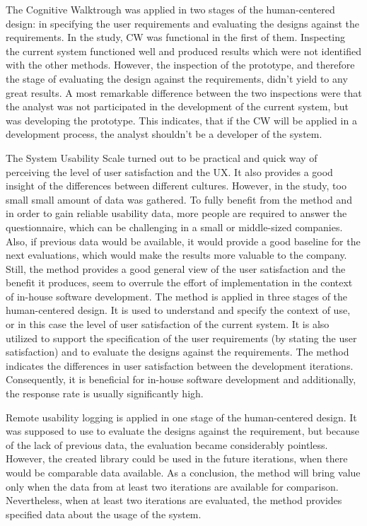 \documentclass[12pt,a4paper,oneside,pdftex]{report}
\begin{document}
The Cognitive Walktrough was applied in two stages of the human-centered design: in specifying the user requirements and evaluating the designs against the requirements. In the study, CW was functional in the first of them. Inspecting the current system functioned well and produced results which were not identified with the other methods. However, the inspection of the prototype, and therefore the stage of evaluating the design against the requirements, didn't yield to any great results. A most remarkable difference between the two inspections were that the analyst was not participated in the development of the current system, but was developing the prototype. This indicates, that if the CW will be applied in a development process, the analyst shouldn't be a developer of the system.  

The System Usability Scale turned out to be practical and quick way of perceiving the level of user satisfaction and the UX. It also provides a good insight of the differences between different cultures. However, in the study, too small small amount of data was gathered. To fully benefit from the method and in order to gain reliable usability data, more people are required to answer the questionnaire, which can be challenging in a small or middle-sized companies. Also, if previous data would be available, it would provide a good baseline for the next evaluations, which would make the results more valuable to the company. Still, the method provides a good general view of the user satisfaction and the benefit it produces, seem to overrule the effort of implementation in the context of in-house software development. The method is applied in three stages of the human-centered design. It is used to understand and specify the context of use, or in this case the level of user satisfaction of the current system. It is also utilized to support the specification of the user requirements (by stating the user satisfaction) and to evaluate the designs against the requirements. The method indicates the differences in user satisfaction between the development iterations. Consequently, it is beneficial for in-house software development and additionally, the response rate is usually significantly high.   

Remote usability logging is applied in one stage of the human-centered design. It was supposed to use to evaluate the designs against the requirement, but because of the lack of previous data, the evaluation became considerably pointless. However, the created library could be used in the future iterations, when there would be comparable data available. As a conclusion, the method will bring value only when the data from at least two iterations are available for comparison. Nevertheless, when at least two iterations are evaluated, the method provides specified data about the usage of the system.
      
\end{document}
